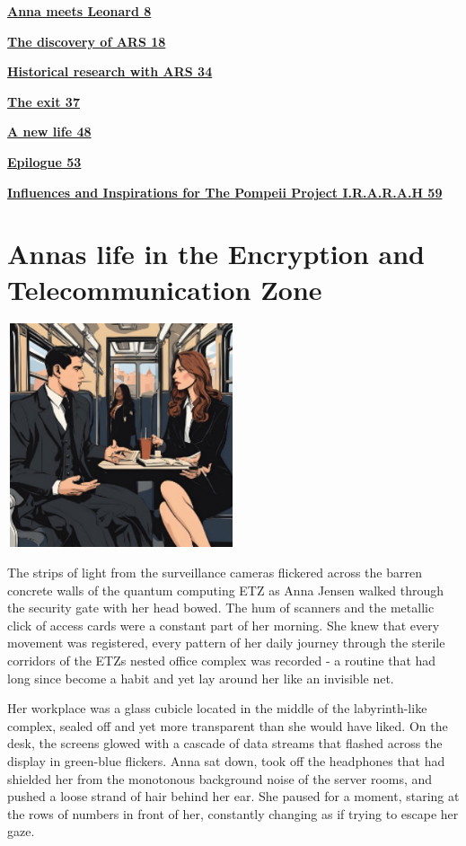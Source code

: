 \documentclass[
]{article}
\begin{document}
\hyperref[anna-meets-leonard]{\textbf{Anna meets Leonard 8}}

\hyperref[the-discovery-of-ars]{\textbf{The discovery of ARS 18}}

\hyperref[historical-research-with-ars]{\textbf{Historical research with
ARS 34}}

\hyperref[the-exit]{\textbf{The exit 37}}

\hyperref[a-new-life]{\textbf{A new life 48}}

\hyperref[epilogue]{\textbf{Epilogue 53}}

\hyperref[influences-and-inspirations-for-the-pompeii-project-i.r.a.r.a.h]{\textbf{Influences
and Inspirations for The Pompeii Project I.R.A.R.A.H 59}}

\section{Anna\textquotesingle s life in the Encryption and
Telecommunication
Zone}\label{annas-life-in-the-encryption-and-telecommunication-zone}

\includegraphics[width=2.64583in,height=2.59375in]{media/image3.png}

The strips of light from the surveillance cameras flickered across the
barren concrete walls of the quantum computing ETZ as Anna Jensen walked
through the security gate with her head bowed. The hum of scanners and
the metallic click of access cards were a constant part of her morning.
She knew that every movement was registered, every pattern of her daily
journey through the sterile corridors of the ETZ\textquotesingle s
nested office complex was recorded - a routine that had long since
become a habit and yet lay around her like an invisible net.

Her workplace was a glass cubicle located in the middle of the
labyrinth-like complex, sealed off and yet more transparent than she
would have liked. On the desk, the screens glowed with a cascade of data
streams that flashed across the display in green-blue flickers. Anna sat
down, took off the headphones that had shielded her from the monotonous
background noise of the server rooms, and pushed a loose strand of hair
behind her ear. She paused for a moment, staring at the rows of numbers
in front of her, constantly changing as if trying to escape her gaze.
\end{document}
